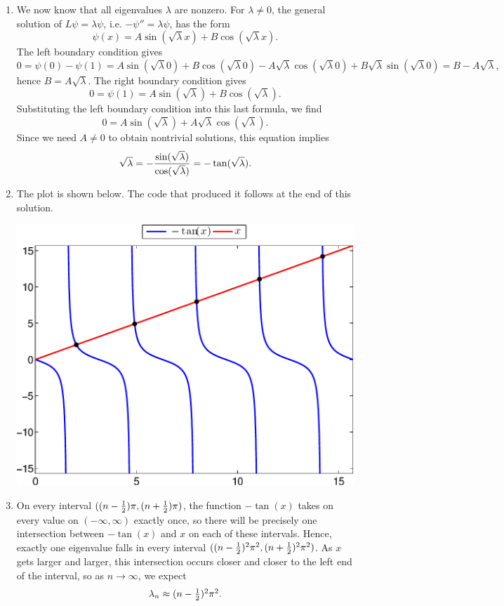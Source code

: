 {\begin{solution}
\begin{enumerate}
\item We now know that all eigenvalues $\lambda$ are nonzero.  For $\lambda\ne 0$,
      the general solution of $L\psi = \lambda \psi$, i.e. $-\psi'' = \lambda \psi$,
      has the form
      \[ \psi(x) = A \sin(\sqrt{\lambda} x) + B \cos(\sqrt{\lambda} x).\]
      The left boundary condition gives
      \[ 0 = \psi(0) - \psi(1) = A \sin(\sqrt{\lambda} 0) + B \cos(\sqrt{\lambda} 0)
                                - A \sqrt{\lambda} \cos(\sqrt{\lambda} 0)
                                + B \sqrt{\lambda} \sin(\sqrt{\lambda} 0)
                               = B - A \sqrt{\lambda},\]
      hence $B = A \sqrt{\lambda}$.
      The right boundary condition gives
      \[ 0 = \psi(1) = A \sin(\sqrt{\lambda}) + B \cos(\sqrt{\lambda}).\]
      Substituting the left boundary condition into this last formula, we find
       \[ 0 = A \sin(\sqrt{\lambda}) + A \sqrt{\lambda} \cos(\sqrt{\lambda}).\]
      Since we need $A\ne 0$ to obtain nontrivial solutions, this equation implies
       \[ \sqrt{\lambda} = - {\sin(\sqrt{\lambda}) \over \cos(\sqrt{\lambda})}
                         = -\tan(\sqrt{\lambda}).\]

\item The plot is shown below.  The code that produced it follows at the end
      of this solution.

\begin{center}
\includegraphics[scale=0.7]{eigroot}
\end{center}
      
\item On every interval $((n-{1\over2})\pi, (n+{1\over2})\pi)$, the function $-\tan(x)$
      takes on every value on $(-\infty,\infty)$ exactly once, so there will be precisely
      one intersection between $-\tan(x)$ and $x$ on each of these intervals.
      Hence, exactly one eigenvalue falls in every interval 
       $((n-{1\over2})^2\pi^2, (n+{1\over2})^2\pi^2)$.
      As $x$ gets larger and larger, this intersection occurs closer and closer to the
      left end of the interval, so as $n\to\infty$, we expect 
      \[ \lambda_n \approx (n-\textstyle{1\over2})^2\pi^2.\]


\end{enumerate}
\end{solution}}
